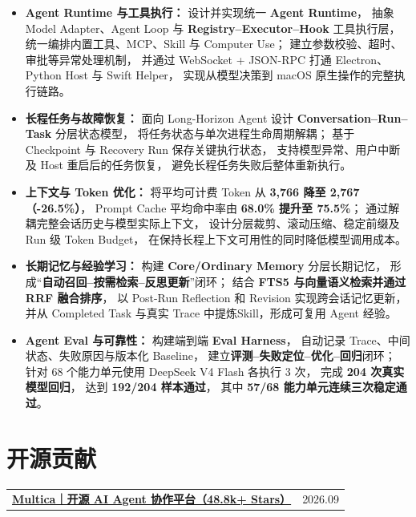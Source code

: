 \documentclass[a4paper,8pt]{article}
\newcommand{\resumeItem}[1]{\item #1}
\begin{document}
\begin{itemize}

\resumeItem{
    \textbf{Agent Runtime 与工具执行：}
    设计并实现统一 \textbf{Agent Runtime}，
    抽象 Model Adapter、Agent Loop 与
    \textbf{Registry--Executor--Hook} 工具执行层，
    统一编排内置工具、MCP、Skill 与 Computer Use；
    建立参数校验、超时、审批等异常处理机制，
    并通过 WebSocket + JSON-RPC 打通 Electron、Python Host 与 Swift Helper，
    实现从模型决策到 macOS 原生操作的完整执行链路。
}

\resumeItem{
    \textbf{长程任务与故障恢复：}
    面向 Long-Horizon Agent 设计
    \textbf{Conversation--Run--Task} 分层状态模型，
    将任务状态与单次进程生命周期解耦；
    基于 Checkpoint 与 Recovery Run 保存关键执行状态，
    支持模型异常、用户中断及 Host 重启后的任务恢复，
    避免长程任务失败后整体重新执行。
}

\resumeItem{
    \textbf{上下文与 Token 优化：}
    将平均可计费 Token 从
    \textbf{3,766 降至 2,767（-26.5\%）}，
    Prompt Cache 平均命中率由
    \textbf{68.0\% 提升至 75.5\%}；
    通过解耦完整会话历史与模型实际上下文，
    设计分层裁剪、滚动压缩、稳定前缀及 Run 级 Token Budget，
    在保持长程上下文可用性的同时降低模型调用成本。
}

\resumeItem{
    \textbf{长期记忆与经验学习：}
    构建 \textbf{Core/Ordinary Memory} 分层长期记忆，
    形成“\textbf{自动召回--按需检索--反思更新}”闭环；
    结合 \textbf{FTS5 与向量语义检索并通过 RRF 融合排序}，
    以 Post-Run Reflection 和 Revision 实现跨会话记忆更新，
    并从 Completed Task 与真实 Trace 中提炼Skill，形成可复用 Agent 经验。
}

\resumeItem{
    \textbf{Agent Eval 与可靠性：}
    构建端到端 \textbf{Eval Harness}，
    自动记录 Trace、中间状态、失败原因与版本化 Baseline，
    建立\textbf{评测--失败定位--优化--回归}闭环；
    针对 68 个能力单元使用 DeepSeek V4 Flash 各执行 3 次，
    完成 \textbf{204 次真实模型回归}，
    达到 \textbf{192/204 样本通过}，
    其中 \textbf{57/68 能力单元连续三次稳定通过}。
}

\end{itemize}


\section{开源贡献}

\begin{tabularx}{\textwidth}{@{}X>{\raggedleft\arraybackslash}p{}@{}}
    \textbf{\large
        \href{https://github.com/multica-ai/multica}
        {Multica｜开源 AI Agent 协作平台（48.8k+ Stars）}}
    &
    \textcolor{muted}{2026.09}
\end{tabularx}
\end{document}
